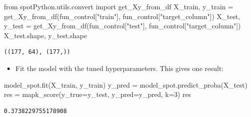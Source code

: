 \documentclass[
  letterpaper,
  DIV=11,
  numbers=noendperiod]{scrreprt}
\newenvironment{Shaded}{\begin{snugshade}}{\end{snugshade}}
\newcommand{\DecValTok}[1]{\textcolor[rgb]{0.68,0.00,0.00}{#1}}
\newcommand{\ImportTok}[1]{\textcolor[rgb]{0.00,0.46,0.62}{#1}}
\newcommand{\NormalTok}[1]{\textcolor[rgb]{0.00,0.23,0.31}{#1}}
\newcommand{\OperatorTok}[1]{\textcolor[rgb]{0.37,0.37,0.37}{#1}}
\newcommand{\StringTok}[1]{\textcolor[rgb]{0.13,0.47,0.30}{#1}}
\providecommand{\tightlist}{%
  \setlength{\itemsep}{0pt}\setlength{\parskip}{0pt}}\usepackage{longtable,booktabs,array}
\begin{document}
\begin{Shaded}
\begin{Highlighting}[]
\ImportTok{from}\NormalTok{ spotPython.utils.convert }\ImportTok{import}\NormalTok{ get\_Xy\_from\_df}
\NormalTok{X\_train, y\_train }\OperatorTok{=}\NormalTok{ get\_Xy\_from\_df(fun\_control[}\StringTok{"train"}\NormalTok{], fun\_control[}\StringTok{"target\_column"}\NormalTok{])}
\NormalTok{X\_test, y\_test }\OperatorTok{=}\NormalTok{ get\_Xy\_from\_df(fun\_control[}\StringTok{"test"}\NormalTok{], fun\_control[}\StringTok{"target\_column"}\NormalTok{])}
\NormalTok{X\_test.shape, y\_test.shape}
\end{Highlighting}
\end{Shaded}

\begin{verbatim}
((177, 64), (177,))
\end{verbatim}

\begin{itemize}
\tightlist
\item
  Fit the model with the tuned hyperparameters. This gives one result:
\end{itemize}

\begin{Shaded}
\begin{Highlighting}[]
\NormalTok{model\_spot.fit(X\_train, y\_train)}
\NormalTok{y\_pred }\OperatorTok{=}\NormalTok{ model\_spot.predict\_proba(X\_test)}
\NormalTok{res }\OperatorTok{=}\NormalTok{ mapk\_score(y\_true}\OperatorTok{=}\NormalTok{y\_test, y\_pred}\OperatorTok{=}\NormalTok{y\_pred, k}\OperatorTok{=}\DecValTok{3}\NormalTok{)}
\NormalTok{res}
\end{Highlighting}
\end{Shaded}

\begin{verbatim}
0.3738229755178908
\end{verbatim}
\end{document}

